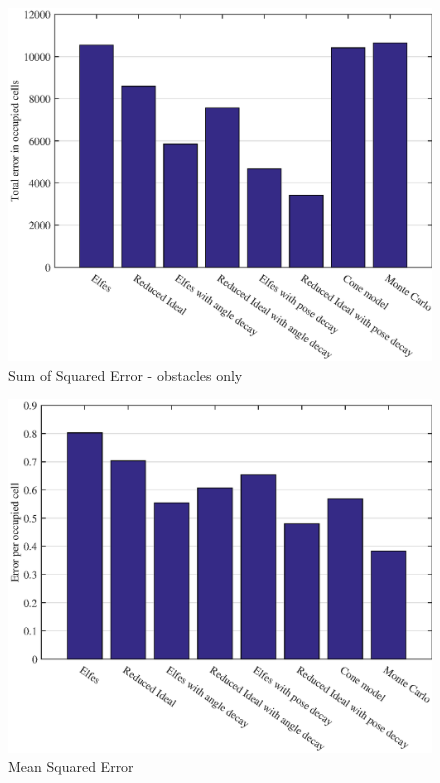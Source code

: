\begin{figure}[htbp]
	\centering
	\includegraphics[scale=1]{figures/static_mapping/comparison_obstacle_error}
	\caption{Sum of Squared Error - obstacles only}
	\label{fig:comparison_obstacle_error}
\end{figure}

\begin{figure}[htbp]
	\centering
	\includegraphics[scale=1]{figures/static_mapping/comparison_obstacle_error_per_cell}
	\caption{Mean Squared Error}
	\label{fig:comparison_obstacle_error_per_cell}
\end{figure}

